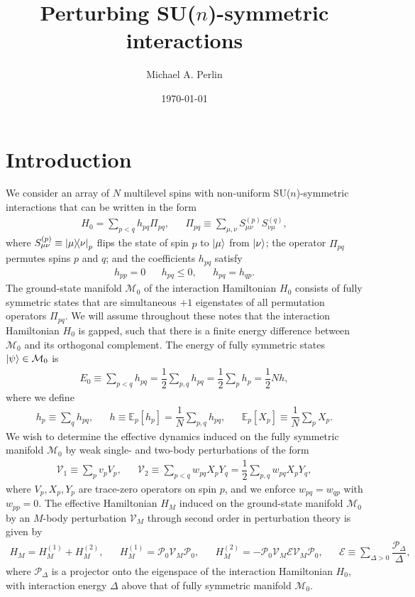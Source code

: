 \documentclass[nofootinbib,notitlepage,11pt]{revtex4-2}
\newcommand{\f}[2]{\dfrac{#1}{#2}} %
\renewcommand{\sp}[1]{\left[#1\right]} %
\newcommand{\1}{\mathds{1}}
\newcommand{\E}{\mathcal{E}}
\newcommand{\M}{\mathcal{M}}
\renewcommand{\P}{\mathcal{P}}
\newcommand{\V}{\mathcal{V}}
\newcommand{\EE}{\mathbb{E}}
\begin{document}
\title{Perturbing SU($n$)-symmetric interactions}%
\author{Michael A. Perlin}%
\date{\today}

\maketitle

\tableofcontents

\section{Introduction}

We consider an array of $N$ multilevel spins with non-uniform
SU($n$)-symmetric interactions that can be written in the form
\begin{align}
  H_0 = \sum_{p<q} h_{pq} \Pi_{pq},
  &&
  \Pi_{pq} \equiv \sum_{\mu,\nu} S_{\mu\nu}^{(p)} S_{\nu\mu}^{(q)},
\end{align}
where $S_{\mu\nu}^{(p)}\equiv\op{\mu}{\nu}_p$ flips the state of spin
$p$ to $\ket\mu$ from $\ket\nu$; the operator $\Pi_{pq}$ permutes
spins $p$ and $q$; and the coefficients $h_{pq}$ satisfy
\begin{align}
  h_{pp} = 0
  &&
  h_{pq} \le 0,
  &&
  h_{pq} = h_{qp}.
\end{align}
The ground-state manifold $\M_0$ of the interaction Hamiltonian $H_0$
consists of fully symmetric states that are simultaneous $+1$
eigenstates of all permutation operators $\Pi_{pq}$.  We will assume
throughout these notes that the interaction Hamiltonian $H_0$ is
gapped, such that there is a finite energy difference between $\M_0$
and its orthogonal complement.  The energy of fully symmetric states
$\ket\psi\in\M_0$ is
\begin{align}
  E_0 \equiv \sum_{p<q} h_{pq} = \f12 \sum_{p,q} h_{pq}
  = \f12 \sum_p h_p = \f12 N h,
\end{align}
where we define
\begin{align}
  h_p \equiv \sum_q h_{pq},
  &&
  h \equiv \EE_p\sp{h_p} = \f1N \sum_{p,q} h_{pq},
  &&
  \EE_p\sp{X_p} \equiv \f1N \sum_p X_p.
\end{align}
We wish to determine the effective dynamics induced on the fully
symmetric manifold $\M_0$ by weak single- and two-body perturbations
of the form
\begin{align}
  \V_1 \equiv \sum_p v_p V_p,
  &&
  \V_2 \equiv \sum_{p<q} w_{pq} X_p Y_q
  = \f12 \sum_{p,q} w_{pq} X_p Y_q,
  \label{eq:perturbations}
\end{align}
where $V_p,X_p,Y_p$ are trace-zero operators on spin $p$, and we
enforce $w_{pq}=w_{qp}$ with $w_{pp}=0$.  The effective Hamiltonian
$H_M$ induced on the ground-state manifold $\M_0$ by an $M$-body
perturbation $\V_M$ through second order in perturbation theory is
given by\cite{bravyi2011schrieffer, perlin2019effective}
\begin{align}
  H_M = H_M^{(1)} + H_M^{(2)},
  &&
  H_M^{(1)} = \P_0 \V_M \P_0,
  &&
  H_M^{(2)} = - \P_0 \V_M \E \V_M \P_0,
  &&
  \E \equiv \sum_{\Delta>0} \f{\P_\Delta}{\Delta},
\end{align}
where $\P_\Delta$ is a projector onto the eigenspace of the
interaction Hamiltonian $H_0$, with interaction energy $\Delta$
above that of fully symmetric manifold $\M_0$.
\end{document}
